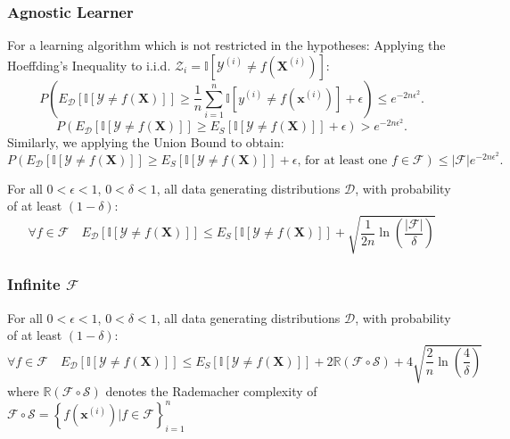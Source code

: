 \subsubsection{Agnostic Learner}
For a learning algorithm which is not restricted in the hypotheses:
Applying the Hoeffding's Inequality to i.i.d. $\mathcal{Z}_i=\mathbb{I}\left[ \mathcal{Y}^{(i)}\neq f\left( \mathcal{\mathbf{X}}^{(i)} \right) \right]$:
\[P\left( E_\mathcal{D}\left[ \mathbb{I}\left[ \mathcal{Y}\neq f\left( \mathcal{\mathbf{X}} \right)  \right] \right] \ge \frac{1}{n}\sum_{i=1}^{n} \mathbb{I}\left[ y^{(i)}\neq f(\mathbf{x}^{(i)}) \right] + \epsilon\right)\le e^{-2n\epsilon^{2}}.\] 
\[P\left( E_\mathcal{D}\left[ \mathbb{I}\left[ \mathcal{Y}\neq f\left( \mathcal{\mathbf{X}} \right)  \right] \right] \ge E_{S} \left[ \mathbb{I}\left[ \mathcal{Y}\neq f(\mathcal{\mathbf{X}}) \right] \right] + \epsilon \right)> e^{-2n\epsilon^{2}}.\] 
Similarly, we applying the Union Bound to obtain:
\[P\left( E_\mathcal{D}\left[ \mathbb{I}\left[ \mathcal{Y}\neq f\left( \mathcal{\mathbf{X}} \right)  \right] \right] \ge E_{S} \left[ \mathbb{I}\left[ \mathcal{Y}\neq f(\mathcal{\mathbf{X}}) \right] \right] + \epsilon\text{, for at least one }f \in \mathcal{F}\right)\le \left| \mathcal{F} \right| e^{-2n\epsilon^{2}}.\] 
\begin{theorem}
  For all $0<\epsilon<1$, $0<\delta<1$, all data generating distributions $\mathcal{D}$, with
  probability of at least $(1-\delta)$:
\[\forall f \in \mathcal{F}\quad E_\mathcal{D}\left[ \mathbb{I}\left[ \mathcal{Y}\neq f\left( \mathcal{\mathbf{X}} \right)  \right] \right] \le E_{S} \left[ \mathbb{I}\left[ \mathcal{Y}\neq f(\mathcal{\mathbf{X}}) \right] \right] + \sqrt{\frac{1}{2n}\ln\left( \frac{\left| \mathcal{F} \right|}{\delta}  \right) }\] 
\end{theorem}

\subsubsection{Infinite $\mathcal{F}$}
\begin{theorem}
  For all $0<\epsilon<1$, $0<\delta<1$, all data generating distributions $\mathcal{D}$, with
  probability of at least $(1-\delta)$:
\[\forall f \in \mathcal{F}\quad E_\mathcal{D}\left[ \mathbb{I}\left[ \mathcal{Y}\neq f\left( \mathcal{\mathbf{X}} \right)  \right] \right] \le E_{S} \left[ \mathbb{I}\left[ \mathcal{Y}\neq f(\mathcal{\mathbf{X}}) \right] \right] + 2\mathbb{R}\left( \mathcal{F}\circ\mathcal{S} \right) + 4\sqrt{\frac{2}{n}\ln\left( \frac{4}{\delta}  \right) }\] 
where $\mathbb{R}\left( \mathcal{F}\circ\mathcal{S} \right)$ denotes the Rademacher complexity of $\mathcal{F}\circ\mathcal{S}={\left\{ f(\mathbf{x}^{(i)})|f \in \mathcal{F} \right\}}_{i=1}^{n}$
\end{theorem}

